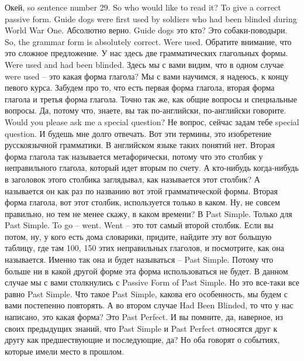 \documentclass[main.tex]{subfiles}
\begin{document}
Окей, so sentence number 29.
So who would like to read it? To give a correct passive form.
Guide dogs were first used by soldiers who had been blinded during World War One.
Абсолютно верно.
Guide dogs это кто? Это собаки-поводыри.
So, the grammar form is absolutely correct.
Were used.
Обратите внимание, что это сложное предложение.
У нас здесь две грамматических глагольных формы.
Were used and had been blinded.
Здесь мы с вами видим, что в одном случае were used -- это какая форма глагола?
Мы с вами научимся, я надеюсь, к концу певого курса.
Забудем про то, что есть первая форма глагола, вторая форма глагола и третья форма глагола.
Точно так же, как общие вопросы и специальные вопросы.
Да, потому что, знаете, вы так по-английски, по-английски говорите.
Would you please ask me a special question? Не вопрос, сейчас задам тебе special question.
И будешь мне долго отвечать.
Вот эти термины, это изобретение русскоязычной грамматики.
В английском языке таких понятий нет.
Вторая форма глагола так называется метафорически, потому что это столбик у неправильного глагола, который идет вторым по счету.
А кто-нибудь когда-нибудь в заголовок этого столбика заглядывал, как называется этот столбик? А называется он как раз по названию вот этой грамматической формы.
Вторая форма глагола, вот этот столбик, используется только в каком.
Ну, не совсем правильно, но тем не менее скажу, в каком времени?
В Past Simple.
Только для Past Simple.
To go -- went.
Went -- это тот самый второй столбик.
Если вы потом, ну, у кого есть дома словарики, придите, найдите эту вот большую таблицу, где там 100, 150 этих неправильных глаголов, и посмотрите, как она называется.
Именно так она и будет называться -- Past Simple.
Потому что больше ни в какой другой форме эта форма использоваться не будет.
В данном случае мы с вами столкнулись с Passive Form of Past Simple.
Но это все-таки все равно Past Simple.
Что такое Past Simple, какова его особенность, мы будем с вами постепенно повторять.
А во втором случае Had Been Blinded, то что у нас написано, это какая форма?
Это Past Perfect.
И вы помните, да, наверное, из своих предыдущих знаний, что Past Simple и Past Perfect относятся друг к другу как предшествующие и последующие, да?
Но оба говорят о событиях, которые имели место в прошлом.
\end{document}
